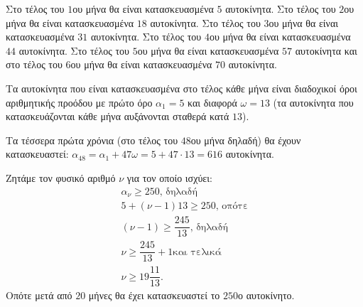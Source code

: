 
\begin{alist}
\item Στο τέλος του $1$ου μήνα θα είναι κατασκευασμένα $5$ αυτοκίνητα.
Στο τέλος του $2$ου μήνα θα είναι κατασκευασμένα $18$ αυτοκίνητα.
Στο τέλος του $3$ου μήνα θα είναι κατασκευασμένα $31$ αυτοκίνητα.
Στο τέλος του $4$ου μήνα θα είναι κατασκευασμένα $44$ αυτοκίνητα.
Στο τέλος του $5$ου μήνα θα είναι κατασκευασμένα $57$ αυτοκίνητα και στο τέλος του $6$ου μήνα
θα είναι κατασκευασμένα $70$ αυτοκίνητα.
\item Τα αυτοκίνητα που είναι κατασκευασμένα στο τέλος κάθε μήνα είναι διαδοχικοί όροι
αριθμητικής προόδου με πρώτο όρο $\alpha_1 = 5$ και διαφορά $\omega = 13$ (τα αυτοκίνητα που
κατασκευάζονται κάθε μήνα αυξάνονται σταθερά κατά $13$).
\item Τα τέσσερα πρώτα χρόνια (στο τέλος του $48$ου μήνα δηλαδή) θα έχουν κατασκευαστεί:
$\alpha_{48} = \alpha_1 + 47\omega = 5 + 47 \cdot 13 = 616$ αυτοκίνητα.
\item Ζητάμε τον φυσικό αριθμό $\nu$ για τον οποίο ισχύει:
\begin{gather*}
\alpha_{\nu} \ge 250\text{, δηλαδή} \\
5 + (\nu - 1)13 \ge 250\text{, οπότε} \\
(\nu - 1) \ge \dfrac{245}{13}\text{, δηλαδή} \\
\nu \ge \dfrac{245}{13} + 1\text{και τελικά} \\
\nu \ge 19 \dfrac{11}{13}.
\end{gather*}
Οπότε μετά από $20$ μήνες θα έχει κατασκευαστεί το $250$ο αυτοκίνητο.
\end{alist}

